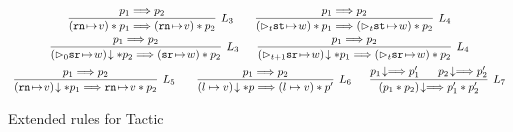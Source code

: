 \begin{figure}[!t]
    \small
    \[
        \begin{array}{c}
            \infer[L_3]
            {
                (\regst{\regN}{\val}) \sepstar \astP_1 \Longrightarrow 
                (\regst{\regN}{\val}) \sepstar \astP_2
            }
            {
                \astP_1 \Longrightarrow \astP_2
            } \qquad 
            \infer[L_4]
            {
                (\dlyregst{t}{\st}{\word}) \sepstar \astP_1 \Longrightarrow 
                (\dlyregst{t}{\st}{\word}) \sepstar \astP_2
            }
            {
                \astP_1 \Longrightarrow \astP_2
            } \\
            \\[-8pt]
            \infer[L_3]
            {
                \nxtAst{(\dlyregst{0}{\sr}{\word})} \sepstar \astP_2 \Longrightarrow 
                (\regst{\sr}{\word}) \sepstar \astP_2
            }
            {
                \astP_1 \Longrightarrow \astP_2
            } \quad \ \ 
            \infer[L_4]
            {
                \nxtAst{(\dlyregst{t+1}{\sr}{\word})} \sepstar \astP_1 \Longrightarrow 
                (\dlyregst{t}{\sr}{\word}) \sepstar \astP_2
            }
            {
                \astP_1 \Longrightarrow \astP_2
            } \\
            \\[-8pt]
            \infer[L_5]
            {
                \nxtAst{(\regst{\regN}{\val})} \sepstar \astP_1 \Longrightarrow 
                \regst{\regN}{\val} \sepstar \astP_2
            }
            {
                \astP_1 \Longrightarrow \astP_2
            } \qquad 
            \infer[L_6]
            {
                \nxtAst{(\sepsto{\loc}{\val})} \sepstar \astP \Longrightarrow 
                (\sepsto{\loc}{\val}) \sepstar \astP'
            }
            {
                \astP_1 \Longrightarrow \astP_2
            } \quad \ \
            \infer[L_7]
            {
                \nxtAst{(\astP_1 \sepstar \astP_2)}
                \Longrightarrow 
                \astP_1' \sepstar \astP_2'
            }
            {
                \nxtAst{\astP_1} \Longrightarrow \astP_1' \quad \ \ 
                \nxtAst{\astP_2} \Longrightarrow \astP_2'
            } 
        \end{array}
    \]
    \caption{Extended rules for Tactic \sepcancel{}}
    \label{fig:ext-rule-tac-sepcancel}
\end{figure}
